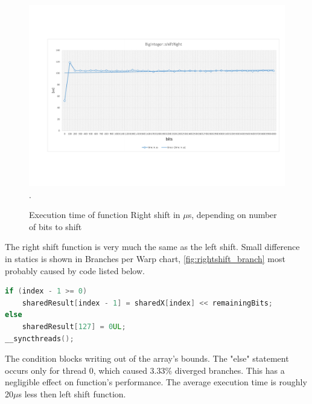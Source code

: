 \documentclass[oneside,openright,12pt,final,en]{mgr}
\begin{document}
\begin{figure}[H]
	\centering
	\includegraphics[width=\textwidth,trim={0.5cm 2.8cm 0.4cm 2.8cm},clip]{rightshift.pdf}.
	\caption{Execution time of function Right shift in $\mu$s, depending on number of bits to shift}
	\label{fig:rightshift}
\end{figure}

The right shift function is very much the same as the left shift. Small difference in statics is shown in Branches per Warp chart, \ref{fig:rightshift_branch} most probably caused by code listed below.
\begin{lstlisting}[language=cpp]
if (index - 1 >= 0)
	sharedResult[index - 1] = sharedX[index] << remainingBits;
else
	sharedResult[127] = 0UL;
__syncthreads();
\end{lstlisting}
The condition blocks writing out of the array's bounds. The "else" statement occurs only for thread 0, which caused 3.33\% diverged branches. This has a negligible effect on function's performance. The  average execution time is roughly 20$\mu$s less then left shift function.
\end{document}
